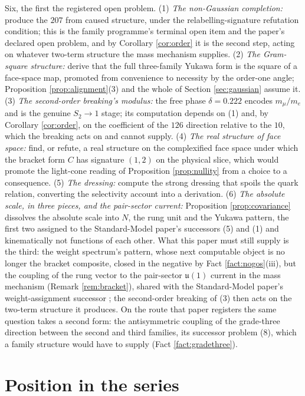 \documentclass[11pt]{article}
\theoremstyle{definition}
\newcommand{\uu}{\mathfrak{u}}
\begin{document}
Six, the first the registered open problem. (1) \emph{The non-Gaussian completion:} produce the $207$ from caused structure, under the relabelling-signature refutation condition; this is the family programme's terminal open item and the paper's declared open problem, and by Corollary \ref{cor:order} it is the second step, acting on whatever two-term structure the mass mechanism supplies. (2) \emph{The Gram-square structure:} derive that the full three-family Yukawa form is the square of a face-space map, promoted from convenience to necessity by the order-one angle; Proposition \ref{prop:alignment}(3) and the whole of Section \ref{sec:gaussian} assume it. (3) \emph{The second-order breaking's modulus:} the free phase $\delta = 0.222$ encodes $m_{\mu}/m_{e}$ and is the genuine $S_{2} \to 1$ stage; its computation depends on (1) and, by Corollary \ref{cor:order}, on the coefficient of the $126$ direction relative to the $10$, which the breaking acts on and cannot supply. (4) \emph{The real structure of face space:} find, or refute, a real structure on the complexified face space under which the bracket form $C$ has signature $(1,2)$ on the physical slice, which would promote the light-cone reading of Proposition \ref{prop:nullity} from a choice to a consequence. (5) \emph{The dressing:} compute the strong dressing that spoils the quark relation, converting the selectivity account into a derivation. (6) \emph{The absolute scale, in three pieces, and the pair-sector current:} Proposition \ref{prop:covariance} dissolves the absolute scale into $N$, the rung unit and the Yukawa pattern, the first two assigned to the Standard-Model paper's successors (5) and (1) and kinematically not functions of each other. What this paper must still supply is the third: the weight spectrum's pattern, whose next computable object is no longer the bracket composite, closed in the negative by Fact \ref{fact:nogos}(iii), but the coupling of the rung vector to the pair-sector $\uu(1)$ current in the mass mechanism (Remark \ref{rem:bracket}), shared with the Standard-Model paper's weight-assignment successor \cite{ButlerT12}; the second-order breaking of (3) then acts on the two-term structure it produces. On the route that paper registers the same question takes a second form: the antisymmetric coupling of the grade-three direction between the second and third families, its successor problem (8), which a family structure would have to supply (Fact \ref{fact:gradethree}).

\section{Position in the series}\label{sec:position}
\end{document}
